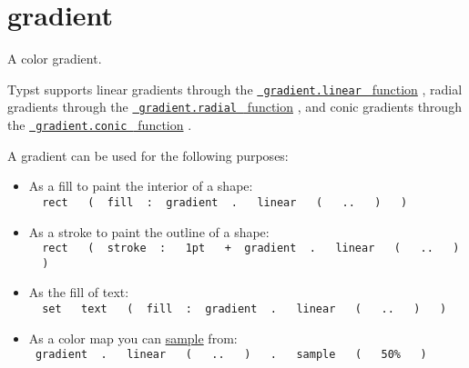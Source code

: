 \section{\texorpdfstring{{ gradient }}{ gradient }}\label{summary}

A color gradient.

Typst supports linear gradients through the
\href{/docs/reference/visualize/gradient/\#definitions-linear}{\texttt{\ gradient.linear\ }
function} , radial gradients through the
\href{/docs/reference/visualize/gradient/\#definitions-radial}{\texttt{\ gradient.radial\ }
function} , and conic gradients through the
\href{/docs/reference/visualize/gradient/\#definitions-conic}{\texttt{\ gradient.conic\ }
function} .

A gradient can be used for the following purposes:

\begin{itemize}
\tightlist
\item
  As a fill to paint the interior of a shape:
  \texttt{\ }{\texttt{\ rect\ }}\texttt{\ }{\texttt{\ (\ }}\texttt{\ fill\ }{\texttt{\ :\ }}\texttt{\ gradient\ }{\texttt{\ .\ }}\texttt{\ }{\texttt{\ linear\ }}\texttt{\ }{\texttt{\ (\ }}\texttt{\ }{\texttt{\ ..\ }}\texttt{\ }{\texttt{\ )\ }}\texttt{\ }{\texttt{\ )\ }}\texttt{\ }
\item
  As a stroke to paint the outline of a shape:
  \texttt{\ }{\texttt{\ rect\ }}\texttt{\ }{\texttt{\ (\ }}\texttt{\ stroke\ }{\texttt{\ :\ }}\texttt{\ }{\texttt{\ 1pt\ }}\texttt{\ }{\texttt{\ +\ }}\texttt{\ gradient\ }{\texttt{\ .\ }}\texttt{\ }{\texttt{\ linear\ }}\texttt{\ }{\texttt{\ (\ }}\texttt{\ }{\texttt{\ ..\ }}\texttt{\ }{\texttt{\ )\ }}\texttt{\ }{\texttt{\ )\ }}\texttt{\ }
\item
  As the fill of text:
  \texttt{\ }{\texttt{\ set\ }}\texttt{\ }{\texttt{\ text\ }}\texttt{\ }{\texttt{\ (\ }}\texttt{\ fill\ }{\texttt{\ :\ }}\texttt{\ gradient\ }{\texttt{\ .\ }}\texttt{\ }{\texttt{\ linear\ }}\texttt{\ }{\texttt{\ (\ }}\texttt{\ }{\texttt{\ ..\ }}\texttt{\ }{\texttt{\ )\ }}\texttt{\ }{\texttt{\ )\ }}\texttt{\ }
\item
  As a color map you can
  \href{/docs/reference/visualize/gradient/\#definitions-sample}{sample}
  from:
  \texttt{\ gradient\ }{\texttt{\ .\ }}\texttt{\ }{\texttt{\ linear\ }}\texttt{\ }{\texttt{\ (\ }}\texttt{\ }{\texttt{\ ..\ }}\texttt{\ }{\texttt{\ )\ }}\texttt{\ }{\texttt{\ .\ }}\texttt{\ }{\texttt{\ sample\ }}\texttt{\ }{\texttt{\ (\ }}\texttt{\ }{\texttt{\ 50\%\ }}\texttt{\ }{\texttt{\ )\ }}\texttt{\ }
\end{itemize}

